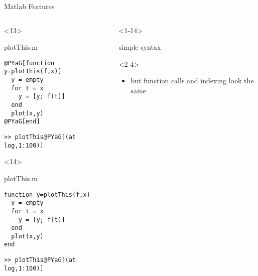 \begin{frame}[fragile]{Matlab Features}
\begin{columns}
\begin{column}{5cm}
      \begin{onlyenv}<13>
        \begin{block}{plotThis.m}
          \begin{Verbatim}[commandchars=@\[\]]
@PYaG[function y=plotThis(f,x)]
  y = empty
  for t = x
    y = [y; f(t)]
  end
  plot(x,y)
@PYaG[end]
          \end{Verbatim}
        \end{block}
          \begin{Verbatim}[commandchars=@\[\]]
>> plotThis@PYaG[(at log,1:100)]
        \end{Verbatim}
      \end{onlyenv}


      \begin{onlyenv}<14>
        \begin{block}{plotThis.m}
          \begin{Verbatim}[commandchars=@\[\]]
function y=plotThis(f,x)
  y = empty
  for t = x
    y = [y; f(t)]
  end
  plot(x,y)
end
          \end{Verbatim}
        \end{block}
          \begin{Verbatim}[commandchars=@\[\]]
>> plotThis@PYaG[(at log,1:100)]
        \end{Verbatim}
      \end{onlyenv}

    \end{column}



    \begin{column}{5cm}
      \begin{itemize}

        \begin{onlyenv}<1-14>
        \item simple syntax
          \begin{onlyenv}<2-4>
            \begin{itemize}
            \item but function calls and indexing look the same
            \end{itemize}         
          \end{onlyenv}
        \end{onlyenv}
        

\end{itemize}
\end{column}
\end{columns}
\end{frame}
